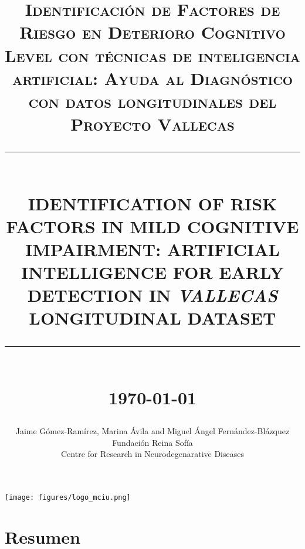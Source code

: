 \documentclass[11pt]{article}
\newcommand{\HRule}[1]{\rule{\linewidth}{#1}}
\begin{document}

\title{ \normalsize \textsc{Identificación de Factores de Riesgo en Deterioro Cognitivo Level con técnicas de inteligencia artificial: Ayuda al Diagnóstico con datos longitudinales del Proyecto Vallecas}
		\\ [2.0cm]
		\HRule{0.5pt} \\
		\LARGE \textbf{\uppercase{Identification of risk factors in Mild Cognitive Impairment: Artificial intelligence   for early detection in \emph{Vallecas} longitudinal dataset}}
		\HRule{2pt} \\ [0.5cm]
		\normalsize \today \vspace*{5\baselineskip}}

\date{}

\author{
		Jaime G\'omez-Ram\'irez, Marina \'Avila and Miguel \'Angel Fern\'andez-Bl\'azquez   \\
		Fundaci\'on Reina Sof\'ia \\
		Centre for Research in Neurodegenarative Diseases }

\maketitle
\begin{center}
\texttt{[image: figures/logo\_mciu.png]}
\end{center}
\newpage
\tableofcontents
\newpage

\sectionfont{\scshape}



\section*{Resumen}
\end{document}
